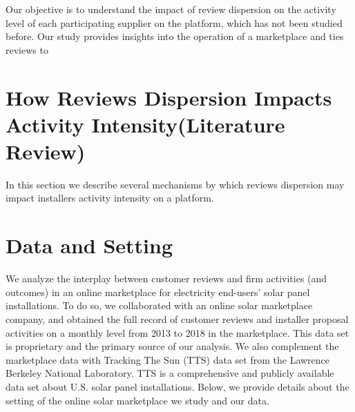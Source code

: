 \documentclass[msom,blindrev]{informs3}
\begin{document}
Our objective is to understand the impact of review dispersion on the activity level of each participating supplier on the platform, which has not been studied before. Our study provides insights into the operation of a marketplace and ties reviews to



\section{How Reviews Dispersion Impacts Activity Intensity(Literature Review) }
 In this section we describe several mechanisms by which reviews dispersion may impact installers activity intensity on a platform.


\section{Data and Setting}

We analyze the interplay between customer reviews and firm activities (and outcomes) in an online marketplace for electricity end-users' solar panel installations. To do so, we collaborated with an online solar marketplace company, and obtained the full record of customer reviews and installer proposal activities on a monthly level from 2013 to 2018 in the marketplace. This data set is proprietary and the primary source of our analysis. We also complement the marketplace data with Tracking The Sun (TTS) data set from the Lawrence Berkeley National Laboratory. TTS is a comprehensive and publicly available data set about U.S. solar panel installations. Below, we provide details about the setting of the online solar marketplace we study and our data.


\end{document}
